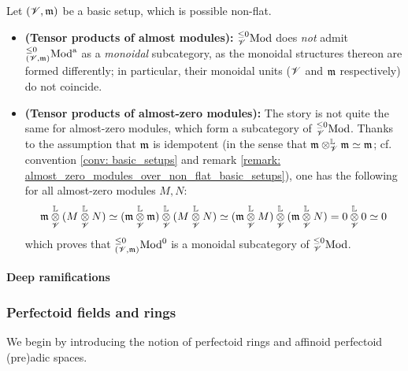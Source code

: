                     \begin{remark} \label{remark: incompatible_monoidal_structures_almost_modules}
                        Let $(\mathscr{V}, \mathfrak{m})$ be a basic setup, which is possible non-flat.
                        \begin{itemize}
                            \item \textbf{(Tensor products of almost modules):} ${}_{\mathscr{V}}^{\leq 0}\mathrm{Mod}$ does \textit{not} admit ${}_{(\mathscr{V}, \mathfrak{m})}^{\leq 0}\mathrm{Mod}^{\mathrm{a}}$ as a \textit{monoidal} subcategory, as the monoidal structures thereon are formed differently; in particular, their monoidal units ($\mathscr{V}$ and $\mathfrak{m}$ respectively) do not coincide.
                            \item \textbf{(Tensor products of almost-zero modules):} The story is not quite the same for almost-zero modules, which form a subcategory of ${}_{\mathscr{V}}^{\leq 0}\mathrm{Mod}$. Thanks to the assumption that $\mathfrak{m}$ is idempotent (in the sense that $\m \tensor_{\scrV}^{\L} \m \cong \m$; cf. convention \ref{conv: basic_setups} and remark \ref{remark: almost_zero_modules_over_non_flat_basic_setups}), one has the following for all almost-zero modules $M, N$:
                                $$\m \tensor_{\scrV}^{\L} (M \tensor_{\scrV}^{\L} N) \cong (\m \tensor_{\scrV}^{\L} \m) \tensor_{\scrV}^{\L} (M \tensor_{\scrV}^{\L} N) \cong (\m \tensor_{\scrV}^{\L} M) \tensor_{\scrV}^{\L} (\m \tensor_{\scrV}^{\L} N) = 0 \tensor_{\scrV}^{\L} 0 \cong 0$$
                            which proves that ${}_{(\mathscr{V}, \mathfrak{m})}^{\leq 0}\mathrm{Mod}^0$ is a monoidal subcategory of ${}_{\mathscr{V}}^{\leq 0}\mathrm{Mod}$. 
                        \end{itemize}
                    \end{remark}
                    
                    \begin{definition} \label{def: almost_flatness}
                    
                    \end{definition}
                
                \paragraph{Deep ramifications}
        
            \subsubsection{Perfectoid fields and rings}
                We begin by introducing the notion of perfectoid rings and affinoid perfectoid (pre)adic spaces.
            
